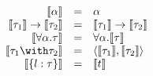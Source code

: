 
\[
\begin{array}{rcl}
  \image \alpha                     & = & \alpha \\
  \image {\ty_1} \to \image {\ty_2} & = & \image {\ty_1} \to \image {\ty_2} \\
  \image {\forall \alpha. \ty}      & = & \forall \alpha. \image \ty \\
  \image {\ty_1 \intersects \ty_2}  & = & \tupled {\image {\ty_1}, \image {\ty_2}} \\
  \image {\recty l \ty}        & = & \image t
\end{array}
\]